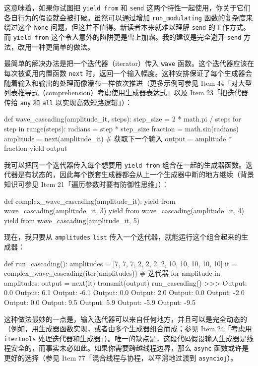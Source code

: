 这意味着，如果你试图把 \texttt{yield from} 和 \texttt{send} 这两个特性一起使用，你关于它们各自行为的假设就会被打破。虽然可以通过增加 \texttt{run\_modulating} 函数的复杂度来绕过这个 \texttt{None} 问题，但这并不值得。新读者本来就难以理解 \texttt{send} 的工作方式。而 \texttt{yield from} 这个令人意外的陷阱更是雪上加霜。我的建议是完全避开 \texttt{send} 方法，改用一种更简单的做法。

最简单的解决办法是把一个迭代器（iterator）传入 \texttt{wave} 函数。这个迭代器应该在每次被调用内置函数 \texttt{next} 时，返回一个输入幅度。这种安排保证了每个生成器会随着输入和输出的处理而像瀑布一样依次推进（更多示例可参见 Item 44「对大型列表推导式（comprehension）考虑使用生成器表达式」以及 Item 23「把迭代器传给 \texttt{any} 和 \texttt{all} 以实现高效短路逻辑」）：

\begin{codebox}[python]
def wave_cascading(amplitude_it, steps):
    step_size = 2 * math.pi / steps
    for step in range(steps):
        radians = step * step_size
        fraction = math.sin(radians)
        amplitude = next(amplitude_it)  # 获取下一个输入
        output = amplitude * fraction
        yield output
\end{codebox}

我可以把同一个迭代器传入每个想要用 \texttt{yield from} 组合在一起的生成器函数。迭代器是有状态的，因此每个嵌套生成器都会从上一个生成器中断的地方继续（背景知识可参见 Item 21「遍历参数时要有防御性思维」）：

\begin{codebox}[python]
def complex_wave_cascading(amplitude_it):
    yield from wave_cascading(amplitude_it, 3)
    yield from wave_cascading(amplitude_it, 4)
    yield from wave_cascading(amplitude_it, 5)
\end{codebox}

现在，我只要从 \texttt{amplitudes} \texttt{list} 传入一个迭代器，就能运行这个组合起来的生成器：

\begin{codebox}[python]
def run_cascading():
    amplitudes = [7, 7, 7, 2, 2, 2, 2, 10, 10, 10, 10, 10]
    it = complex_wave_cascading(iter(amplitudes))  # 迭代器
    for amplitude in amplitudes:
        output = next(it)
        transmit(output)
run_cascading()
>>>
Output:   0.0
Output:   6.1
Output:  -6.1
Output:   0.0
Output:   2.0
Output:   0.0
Output:  -2.0
Output:   0.0
Output:   9.5
Output:   5.9
Output:  -5.9
Output:  -9.5
\end{codebox}

这种做法最妙的一点是，输入迭代器可以来自任何地方，并且可以是完全动态的（例如，用生成器函数实现，或者由多个生成器组合而成；参见 Item 24「考虑用 \texttt{itertools} 处理迭代器和生成器」）。唯一的缺点是，这段代码假设输入生成器是线程安全的，而事实未必如此。如果你需要跨越线程边界，那么 \texttt{async} 函数或许是更好的选择（参见 Item 77「混合线程与协程，以平滑地过渡到 \texttt{asyncio}」）。

